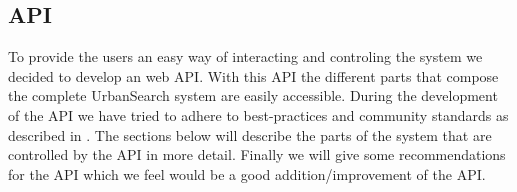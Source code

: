 \subsection{API}
To provide the users an easy way of interacting and controling the system we decided to develop an web API. With this API the different parts that compose the complete UrbanSearch system are easily accessible. During the development of the API we have tried to adhere to best-practices and community standards as described in \cite{apigee}. The sections below will describe the parts of the system that are controlled by the API in more detail. Finally we will give some recommendations for the API which we feel would be a good addition/improvement of the API.

\subsubsection{}